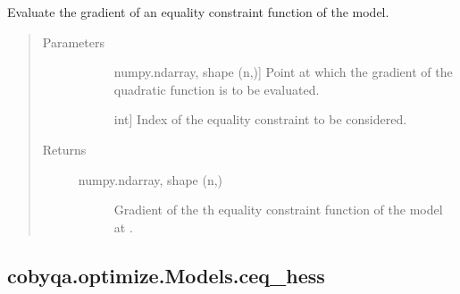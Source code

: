 \documentclass[letterpaper,10pt,english]{sphinxmanual}
\begin{document}
\begin{fulllineitems}
\begin{fulllineitems}
\label{\detokenize{refs/generated/cobyqa.optimize.Models.ceq_grad:cobyqa.optimize.Models.ceq_grad}}
\sphinxAtStartPar
Evaluate the gradient of an equality constraint function of the model.
\begin{quote}\begin{description}
\item[{Parameters}] \leavevmode\begin{description}
\item[{}] \leavevmode{[}numpy.ndarray, shape (n,){]}
\sphinxAtStartPar
Point at which the gradient of the quadratic function is to be
evaluated.

\item[{}] \leavevmode{[}int{]}
\sphinxAtStartPar
Index of the equality constraint to be considered.

\end{description}

\item[{Returns}] \leavevmode\begin{description}
\item[{numpy.ndarray, shape (n,)}] \leavevmode
\sphinxAtStartPar
Gradient of the \sphinxhyphen{}th equality constraint function of the model at
.

\end{description}

\end{description}\end{quote}

\end{fulllineitems}



\subsection{cobyqa.optimize.Models.ceq\_hess}
\label{\detokenize{refs/generated/cobyqa.optimize.Models.ceq_hess:cobyqa-optimize-models-ceq-hess}}\label{\detokenize{refs/generated/cobyqa.optimize.Models.ceq_hess::doc}}


\end{fulllineitems}
\end{document}
